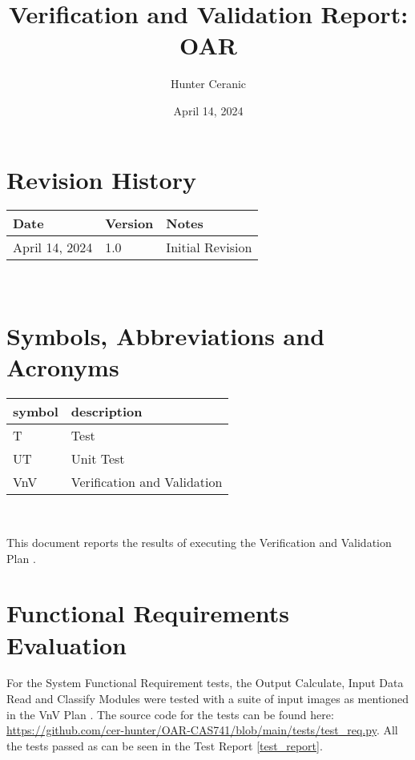 \documentclass[12pt, titlepage]{article}
\begin{document}
\title{Verification and Validation Report: OAR} 
\author{Hunter Ceranic}
\date{April 14, 2024}
	
\maketitle


\section{Revision History}

\begin{tabularx}{\textwidth}{p{3cm}p{2cm}X}
\toprule {\bf Date} & {\bf Version} & {\bf Notes}\\
\midrule
April 14, 2024 & 1.0 & Initial Revision\\
\bottomrule
\end{tabularx}

~\newpage

\section{Symbols, Abbreviations and Acronyms}

\renewcommand{\arraystretch}{1.2}
\begin{tabular}{l l} 
  \toprule		
  \textbf{symbol} & \textbf{description}\\
  \midrule 
  T & Test\\
  UT & Unit Test\\
  VnV& Verification and Validation\\
  \bottomrule
\end{tabular}\\

\newpage

\tableofcontents

\newpage


This document reports the results of executing the Verification and Validation Plan \citep{VnVPlan}.

\section{Functional Requirements Evaluation}

For the System Functional Requirement tests, the Output Calculate, Input Data Read and Classify Modules were tested
with a suite of input images as mentioned in the VnV Plan \citep{VnVPlan}. The source code for the tests can be found here:
\url{https://github.com/cer-hunter/OAR-CAS741/blob/main/tests/test_req.py}.
All the tests passed as can be seen in the Test Report \ref{test_report}.\\
\end{document}
